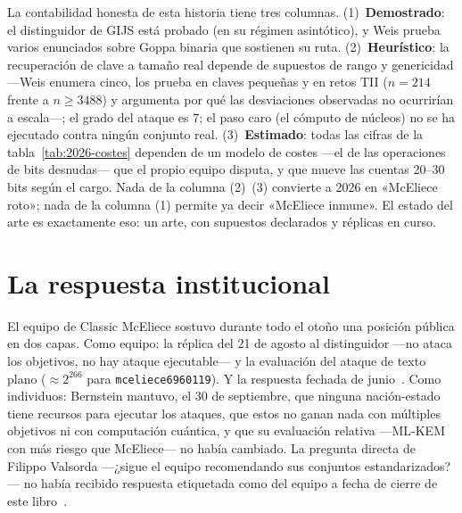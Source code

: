 \documentclass[11pt,a4paper,oneside]{report}
\begin{document}
\begin{rigor}
La contabilidad honesta de esta historia tiene tres columnas.
(1)~\textbf{Demostrado}: el distinguidor de GIJS está probado (en
su régimen asintótico), y Weis prueba varios enunciados sobre
Goppa binaria que sostienen su ruta. (2)~\textbf{Heurístico}: la
recuperación de clave a tamaño real depende de supuestos de rango
y genericidad ---Weis enumera cinco, los prueba en claves pequeñas
y en retos TII ($n=214$ frente a $n\ge3488$) y argumenta por qué
las desviaciones observadas no ocurrirían a escala---; el grado
del ataque es 7; el paso caro (el cómputo de núcleos) no se ha
ejecutado contra ningún conjunto real. (3)~\textbf{Estimado}: todas
las cifras de la tabla~\ref{tab:2026-costes} dependen de un modelo
de costes ---el de las operaciones de bits desnudas--- que el
propio equipo disputa, y que mueve las cuentas 20--30 bits según
el cargo. Nada de la columna (2)~(3) convierte a 2026 en «McEliece
roto»; nada de la columna (1) permite ya decir «McEliece inmune».
El estado del arte es exactamente eso: un arte, con supuestos
declarados y réplicas en curso.
\end{rigor}

\section{La respuesta institucional}\label{sec:2026-institucional}

El equipo de Classic McEliece sostuvo durante todo el otoño una
posición pública en dos capas. Como equipo: la réplica del 21 de
agosto al distinguidor ---no ataca los objetivos, no hay ataque
ejecutable--- y la evaluación del ataque de texto plano
($\approx 2^{266}$ para \texttt{mceliece6960119}). Y la respuesta
fechada de junio~\cite{cm610}. Como individuos: Bernstein mantuvo,
el 30 de septiembre, que ninguna nación-estado tiene recursos para
ejecutar los ataques, que estos no ganan nada con múltiples
objetivos ni con computación cuántica, y que su evaluación relativa
---ML-KEM con más riesgo que McEliece--- no había cambiado. La
pregunta directa de Filippo Valsorda ---¿sigue el equipo
recomendando sus conjuntos estandarizados?--- no había recibido
respuesta etiquetada como del equipo a fecha de cierre de este
libro~\cite{bernstein2026}.
\end{document}
